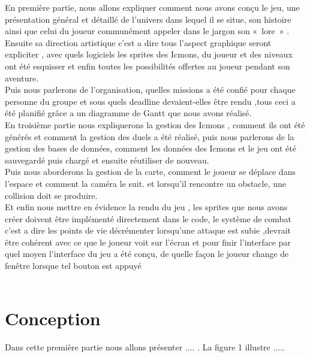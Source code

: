 \documentclass[12pt,a4paper, twoside]{article}
\begin{document}
En première partie, nous allons expliquer comment nous avons conçu le jeu, une présentation général et détaillé de l’univers dans lequel il se situe, son histoire ainsi que celui du joueur communément appeler dans le jargon son « lore » .
Ensuite sa direction artistique c’est a dire tous l’aspect graphique seront expliciter , avec quels logiciels les sprites des Icmons, du joueur et des niveaux ont été esquisser et enfin toutes les possibilités offertes au joueur pendant son aventure.\\

Puis nous parlerons de l’organisation, quelles missions a été confié pour chaque personne du groupe et sous quels deadline devaient-elles être rendu ,tous ceci a été planifié grâce a un diagramme de Gantt que nous avons réalisé.\\

En troisième partie nous expliquerons la gestion des Icmons , comment ils ont été générés et comment la gestion des duels a été réalisé, puis nous parlerons de la gestion des bases de données, comment les données des Icmons et le jeu ont été sauvegardé puis chargé et ensuite réutiliser de nouveau.\\

Puis nous aborderons la gestion de la carte, comment le joueur se déplace dans l'espace et comment la caméra le suit. et lorsqu'il rencontre un obstacle, une collision doit se produire.\\

Et enfin nous mettre en évidence la rendu du jeu , les sprites que nous avons créer doivent être implémenté directement dans le code, le système de combat c’est a dire les points de vie décrémenter lorsqu’une attaque est subie ,devrait être cohérent avec ce que le joueur voit sur l’écran et pour finir l’interface par quel moyen l’interface du jeu a été conçu, de quelle façon le joueur change de fenêtre lorsque tel bouton est appuyé\\\\
\lfoot{}
\newpage
\section{Conception}
    Dans cette première partie nous allons présenter .... . La figure 1 illustre .....
\end{document}
